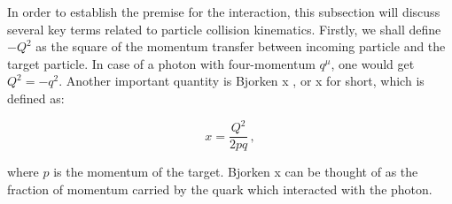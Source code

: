 In order to establish the premise for the interaction, this subsection will discuss several key terms related to particle collision kinematics. Firstly, we shall define $-Q^2$ as the square of the momentum transfer between incoming particle and the target particle. In case of a photon with four-momentum $q^\mu$, one would get $Q^2 = -q^2$. Another important quantity is Bjorken x , or x for short, which is defined as:

\begin{equation}\label{eq:bjorken_x}
	x = \frac{Q^2}{2pq}\,,
\end{equation}

where $p$ is the momentum of the target. Bjorken x can be thought of as the fraction of momentum carried by the quark which interacted with the photon.